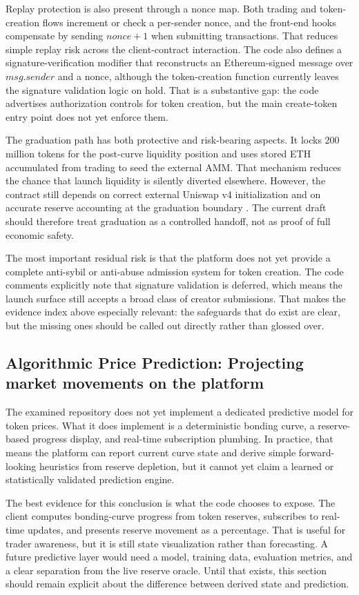 \documentclass[10pt,letterpaper]{article}
\begin{document}
Replay protection is also present through a nonce map. Both trading and token-creation flows increment or check a per-sender nonce, and the front-end hooks compensate by sending \(nonce + 1\) when submitting transactions. That reduces simple replay risk across the client-contract interaction. The code also defines a signature-verification modifier that reconstructs an Ethereum-signed message over \(msg.sender\) and a nonce, although the token-creation function currently leaves the signature validation logic on hold. That is a substantive gap: the code advertises authorization controls for token creation, but the main create-token entry point does not yet enforce them.

The graduation path has both protective and risk-bearing aspects. It locks 200 million tokens for the post-curve liquidity position and uses stored ETH accumulated from trading to seed the external AMM. That mechanism reduces the chance that launch liquidity is silently diverted elsewhere. However, the contract still depends on correct external Uniswap v4 initialization and on accurate reserve accounting at the graduation boundary \citep{UniswapV4Docs}. The current draft should therefore treat graduation as a controlled handoff, not as proof of full economic safety.

The most important residual risk is that the platform does not yet provide a complete anti-sybil or anti-abuse admission system for token creation. The code comments explicitly note that signature validation is deferred, which means the launch surface still accepts a broad class of creator submissions. That makes the evidence index above especially relevant: the safeguards that do exist are clear, but the missing ones should be called out directly rather than glossed over.

\subsection{Algorithmic Price Prediction: Projecting market movements on the platform}
The examined repository does not yet implement a dedicated predictive model for token prices. What it does implement is a deterministic bonding curve, a reserve-based progress display, and real-time subscription plumbing. In practice, that means the platform can report current curve state and derive simple forward-looking heuristics from reserve depletion, but it cannot yet claim a learned or statistically validated prediction engine.

The best evidence for this conclusion is what the code chooses to expose. The client computes bonding-curve progress from token reserves, subscribes to real-time updates, and presents reserve movement as a percentage. That is useful for trader awareness, but it is still state visualization rather than forecasting. A future predictive layer would need a model, training data, evaluation metrics, and a clear separation from the live reserve oracle. Until that exists, this section should remain explicit about the difference between derived state and prediction.
\end{document}

